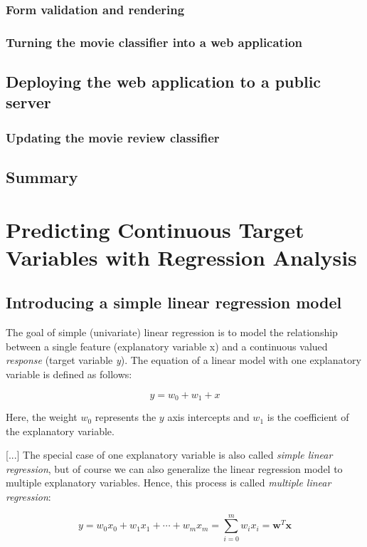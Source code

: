 \documentclass[letterpaper]{report}
\begin{document}
\subsection{Form validation and rendering}
\subsection{Turning the movie classifier into a web application}
\section{Deploying the web application to a public server}
\subsection{Updating the movie review classifier}
\section{Summary}




\chapter{Predicting Continuous Target Variables with Regression Analysis}

\section{Introducing a simple linear regression model}

The goal of simple (univariate) linear regression is to model the relationship between a single feature (explanatory variable x) and a continuous valued \textit{response} (target variable \textit{y}). The equation of a linear model with one explanatory variable is defined as follows:

\[
y = w_0 + w_1 + x
\]

Here, the weight $w_0$ represents the $y$ axis intercepts and $w_1$ is the coefficient of the explanatory variable.

[...] The special case of one explanatory variable is also called \textit{simple linear regression}, but of course we can also generalize the linear regression model to multiple explanatory variables. Hence, this process is called \textit{multiple linear regression}:

\[
y = w_0 x_0 + w_1 x_1 + \cdots + w_m x_m = \sum_{i=0}^{m} w_i x_i = \mathbf{w}^T \mathbf{x}
\]
\end{document}

